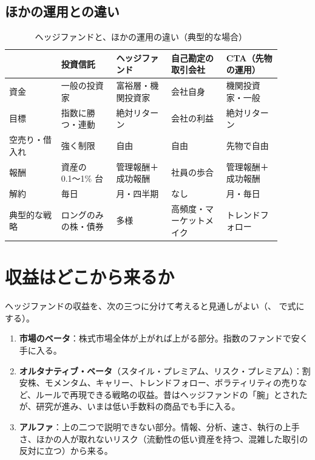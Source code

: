 \subsection{ほかの運用との違い}

\begin{table}[H]
\centering\small
\caption{ヘッジファンドと、ほかの運用の違い（典型的な場合）}
\label{tab:types}
\begin{tabular}{@{}P{0.17\linewidth}P{0.18\linewidth}P{0.18\linewidth}P{0.18\linewidth}P{0.18\linewidth}@{}}
\toprule
 & 投資信託 & ヘッジファンド & 自己勘定の取引会社 & CTA（先物の運用） \\
\midrule
資金 & 一般の投資家 & 富裕層・機関投資家 & 会社自身 & 機関投資家・一般 \\
目標 & 指数に勝つ・連動 & 絶対リターン & 会社の利益 & 絶対リターン \\
空売り・借入れ & 強く制限 & 自由 & 自由 & 先物で自由 \\
報酬 & 資産の 0.1〜1\% 台 & 管理報酬＋成功報酬 & 社員の歩合 & 管理報酬＋成功報酬 \\
解約 & 毎日 & 月・四半期 & なし & 月・毎日 \\
典型的な戦略 & ロングのみの株・債券 & 多様 & 高頻度・マーケットメイク & トレンドフォロー \\
\bottomrule
\end{tabular}
\end{table}

\section{収益はどこから来るか}

ヘッジファンドの収益を、次の三つに分けて考えると見通しがよい（、 で式にする）。

\begin{enumerate}
\item \textbf{市場のベータ}：株式市場全体が上がれば上がる部分。指数のファンドで安く手に入る。
\item \textbf{オルタナティブ・ベータ}（スタイル・プレミアム、リスク・プレミアム）：割安株、モメンタム、キャリー、トレンドフォロー、ボラティリティの売りなど、ルールで再現できる戦略の収益。昔はヘッジファンドの「腕」とされたが、研究が進み、いまは低い手数料の商品でも手に入る。
\item \textbf{アルファ}：上の二つで説明できない部分。情報、分析、速さ、執行の上手さ、ほかの人が取れないリスク（流動性の低い資産を持つ、混雑した取引の反対に立つ）から来る。
\end{enumerate}

